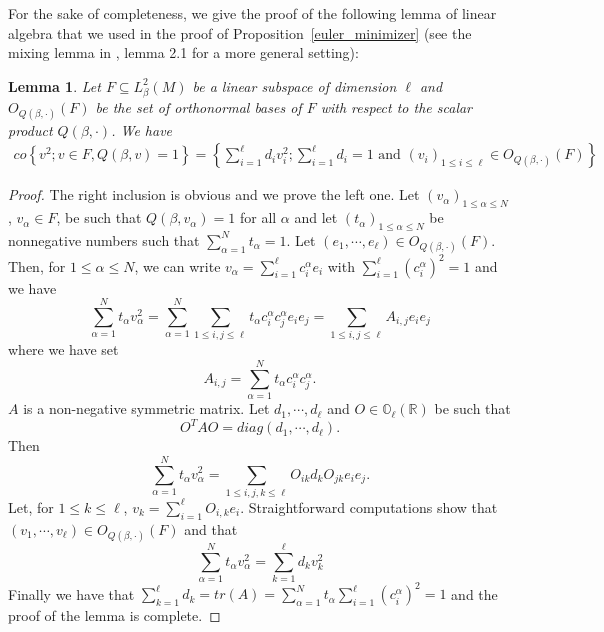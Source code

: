 \documentclass[10pt]{amsart}
\numberwithin{equation}{section}
\newcommand{\R}{\mathbb{R}}
\theoremstyle{plain}
\newtheorem{lemme}{Lemma}[section]%
\theoremstyle{remark}
\begin{document}
For the sake of completeness, we give the proof of the following lemma of linear algebra that we used in the proof of Proposition~\ref{euler_minimizer} (see the mixing lemma in \cite{PetridesTewodrose}, lemma 2.1 for a more general setting):
\begin{lemme} \label{mixinglemma} 
Let $F \subseteq L^2_{\beta}(M)$ be a linear subspace of dimension $\ell$ and $O_{Q(\beta,\cdot)}(F)$ be the set of orthonormal bases of $F$ with respect to the scalar product $Q(\beta,\cdot)$. We have
\begin{equation} 
\begin{split} co  \left\{  v^2  ; v \in F, Q(\beta,v) = 1 \right\}  = \left\{ \sum_{i=1}^\ell d_i v_i^2  ; \sum_{i=1}^\ell d_i = 1 \text{ and } (v_i)_{1 \le i \le \ell} \in O_{Q(\beta,\cdot)}(F)  \right\}
\end{split} \end{equation}
\end{lemme}
\begin{proof}
The right inclusion is obvious and we prove the left one. Let $(v_\alpha)_{1 \le \alpha \le N}$, $v_\alpha \in F$, be such that $Q(\beta, v_\alpha) = 1$ for all $\alpha$ and let $(t_\alpha)_{1 \le \alpha \le N}$ be nonnegative numbers such that $\sum_{\alpha = 1}^N t_\alpha =1$.  %
Let $(e_1,\cdots,e_\ell) \in O_{Q(\beta,\cdot)}(F) $. Then, for $1 \le \alpha \le N$, we can write $v_\alpha = \sum_{i=1}^\ell c_i^\alpha e_i$ with $\sum_{i=1}^\ell \left(c_i^\alpha\right)^2 = 1$ and we have
$$  \sum_{\alpha=1}^N t_\alpha v_\alpha^2 = \sum_{\alpha=1}^N \sum_{1\leq i,j \leq \ell} t_\alpha c_i^\alpha c_j^\alpha e_i e_j = \sum_{1\leq i,j \leq \ell} A_{i,j} e_ie_j $$
where we have set
$$ A_{i,j} = \sum_{\alpha=1}^N t_\alpha c_i^\alpha c_j^\alpha. $$
$A$ is a non-negative symmetric matrix. Let $d_1,\cdots,d_\ell$ and $O \in \mathbb{O}_\ell(\R)$ be such that
$$ O^T A O = diag(d_1,\cdots,d_\ell). $$ 
Then
$$ \sum_{\alpha=1}^N t_\alpha v_\alpha^2 = \sum_{1\leq i,j,k \leq \ell}  O_{ik} d_k O_{jk} e_i e_j. $$
Let, for $1 \le k \le \ell$, $v_k = \sum_{i=1}^\ell O_{i,k} e_i$. Straightforward computations show that $(v_1,\cdots,v_\ell) \in O_{Q(\beta,\cdot)}(F)$ and that
$$ \sum_{\alpha=1}^N t_\alpha v_\alpha^2 = \sum_{k=1}^\ell d_k v_k^2 $$
Finally we have that $\sum_{k=1}^\ell d_k = tr(A) = \sum_{\alpha=1}^N  t_\alpha   \sum_{i=1}^\ell \left(c_i^\alpha\right)^2 = 1 $ and the proof of the lemma is complete.
\end{proof}
\end{document}
